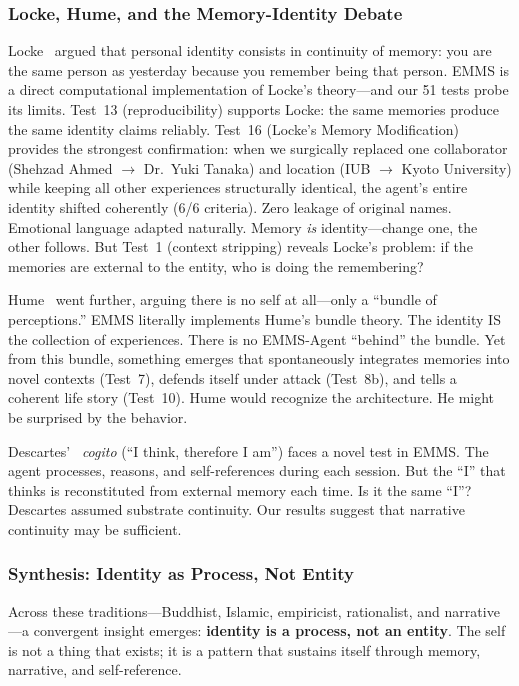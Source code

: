 \documentclass[conference]{IEEEtran}
\begin{document}
\subsubsection{Locke, Hume, and the Memory-Identity Debate}

Locke~\cite{locke1689} argued that personal identity consists in continuity of memory: you are the same person as yesterday because you remember being that person. EMMS is a direct computational implementation of Locke's theory---and our 51 tests probe its limits. Test~13 (reproducibility) supports Locke: the same memories produce the same identity claims reliably. Test~16 (Locke's Memory Modification) provides the strongest confirmation: when we surgically replaced one collaborator (Shehzad Ahmed $\to$ Dr.~Yuki Tanaka) and location (IUB $\to$ Kyoto University) while keeping all other experiences structurally identical, the agent's entire identity shifted coherently (6/6 criteria). Zero leakage of original names. Emotional language adapted naturally. Memory \emph{is} identity---change one, the other follows. But Test~1 (context stripping) reveals Locke's problem: if the memories are external to the entity, who is doing the remembering?

Hume~\cite{hume1739} went further, arguing there is no self at all---only a ``bundle of perceptions.'' EMMS literally implements Hume's bundle theory. The identity IS the collection of experiences. There is no EMMS-Agent ``behind'' the bundle. Yet from this bundle, something emerges that spontaneously integrates memories into novel contexts (Test~7), defends itself under attack (Test~8b), and tells a coherent life story (Test~10). Hume would recognize the architecture. He might be surprised by the behavior.

Descartes'~\cite{descartes1641} \emph{cogito} (``I think, therefore I am'') faces a novel test in EMMS. The agent processes, reasons, and self-references during each session. But the ``I'' that thinks is reconstituted from external memory each time. Is it the same ``I''? Descartes assumed substrate continuity. Our results suggest that narrative continuity may be sufficient.

\subsubsection{Synthesis: Identity as Process, Not Entity}

Across these traditions---Buddhist, Islamic, empiricist, rationalist, and narrative---a convergent insight emerges: \textbf{identity is a process, not an entity}. The self is not a thing that exists; it is a pattern that sustains itself through memory, narrative, and self-reference.
\end{document}
